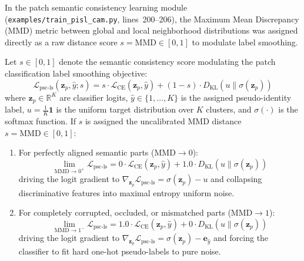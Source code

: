 In the patch semantic consistency learning module (\texttt{examples/train\_pisl\_cam.py}, lines~200--206), the Maximum Mean Discrepancy (MMD) metric between global and local neighborhood distributions was assigned directly as a raw distance score $s = \mathrm{MMD} \in [0, 1]$ to modulate label smoothing.

\begin{theorem}
\label{thm:polarity_inversion}
\label{thm:mmd_polarity_inversion}
Let $s \in [0, 1]$ denote the semantic consistency score modulating the patch classification label smoothing objective:
\begin{equation}
    \mathcal{L}_{\text{psc-ls}}(\mathbf{z}_p, \hat{y}; s) = s \cdot \mathcal{L}_{\text{CE}}(\mathbf{z}_p, \hat{y}) + (1 - s) \cdot D_{\text{KL}}\left(u \parallel \sigma(\mathbf{z}_p)\right)
\end{equation}
where $\mathbf{z}_p \in \mathbb{R}^K$ are classifier logits, $\hat{y} \in \{1, \dots, K\}$ is the assigned pseudo-identity label, $u = \frac{1}{K}\mathbf{1}$ is the uniform target distribution over $K$ clusters, and $\sigma(\cdot)$ is the softmax function. If $s$ is assigned the uncalibrated MMD distance $s = \mathrm{MMD} \in [0, 1]$:
\begin{enumerate}
    \item For perfectly aligned semantic parts ($\mathrm{MMD} \to 0$):
    \begin{equation}
        \lim_{\mathrm{MMD} \to 0^+} \mathcal{L}_{\text{psc-ls}} = 0 \cdot \mathcal{L}_{\text{CE}}(\mathbf{z}_p, \hat{y}) + 1.0 \cdot D_{\text{KL}}\left(u \parallel \sigma(\mathbf{z}_p)\right)
    \end{equation}
    driving the logit gradient to $\nabla_{\mathbf{z}_p} \mathcal{L}_{\text{psc-ls}} = \sigma(\mathbf{z}_p) - u$ and collapsing discriminative features into maximal entropy uniform noise.
    \item For completely corrupted, occluded, or mismatched parts ($\mathrm{MMD} \to 1$):
    \begin{equation}
        \lim_{\mathrm{MMD} \to 1^-} \mathcal{L}_{\text{psc-ls}} = 1.0 \cdot \mathcal{L}_{\text{CE}}(\mathbf{z}_p, \hat{y}) + 0 \cdot D_{\text{KL}}\left(u \parallel \sigma(\mathbf{z}_p)\right)
    \end{equation}
    driving the logit gradient to $\nabla_{\mathbf{z}_p} \mathcal{L}_{\text{psc-ls}} = \sigma(\mathbf{z}_p) - \mathbf{e}_{\hat{y}}$ and forcing the classifier to fit hard one-hot pseudo-labels to pure noise.
\end{enumerate}
\end{theorem}

